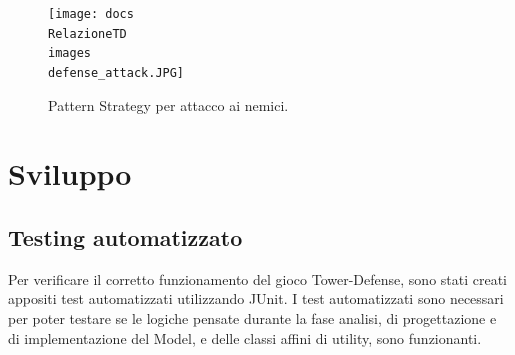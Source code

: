 \documentclass[a4paper,12pt]{report}
\begin{document}
\begin{figure}[H]
    \centering
    \texttt{[image: docs\\RelazioneTD\\images\\defense\_attack.JPG]}
    \caption{Pattern Strategy per attacco ai nemici.}
    \label{fig:defense_attack}
\end{figure}

\chapter{Sviluppo}
\section{Testing automatizzato}
Per verificare il corretto funzionamento del gioco Tower-Defense, sono stati creati appositi test automatizzati utilizzando JUnit. 
I test automatizzati sono necessari per poter testare se le logiche pensate durante la fase analisi, di progettazione e di implementazione del Model, e delle classi affini di utility, sono funzionanti.
\end{document}
